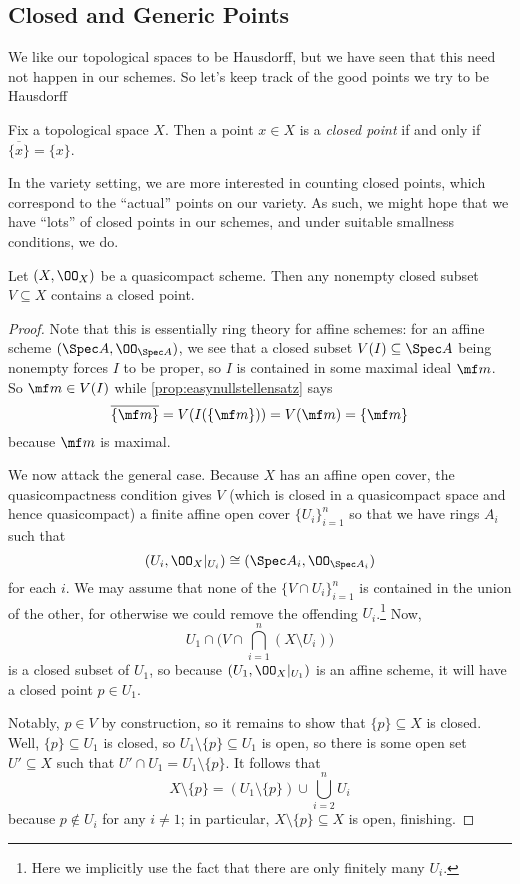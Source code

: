 \documentclass[../notes.tex]{subfiles}
\begin{document}
\subsection{Closed and Generic Points}
We like our topological spaces to be Hausdorff, but we have seen that this need not happen in our schemes. So let's keep track of the good points we try to be Hausdorff
\begin{definition}
	Fix a topological space $X$. Then a point $x\in X$ is a \textit{closed point} if and only if $\overline{\{x\}}=\{x\}$.
\end{definition}
In the variety setting, we are more interested in counting closed points, which correspond to the ``actual'' points on our variety. As such, we might hope that we have ``lots'' of closed points in our schemes, and under suitable smallness conditions, we do.
\begin{lemma}
	Let $(X,\OO_X)$ be a quasicompact scheme. Then any nonempty closed subset $V\subseteq X$ contains a closed point.
\end{lemma}
\begin{proof}
	Note that this is essentially ring theory for affine schemes: for an affine scheme $(\Spec A,\OO_{\Spec A})$, we see that a closed subset $V(I)\subseteq\Spec A$ being nonempty forces $I$ to be proper, so $I$ is contained in some maximal ideal $\mf m$. So $\mf m\in V(I)$ while \autoref{prop:easynullstellensatz} says
	\[\overline{\{\mf m\}}=V(I(\{\mf m\}))=V(\mf m)=\{\mf m\}\]
	because $\mf m$ is maximal.

	We now attack the general case. Because $X$ has an affine open cover, the quasicompactness condition gives $V$ (which is closed in a quasicompact space and hence quasicompact) a finite affine open cover $\{U_i\}_{i=1}^n$ so that we have rings $A_i$ such that
	\[(U_i,\OO_X|_{U_i})\cong(\Spec A_i,\OO_{\Spec A_i})\]
	for each $i$. We may assume that none of the $\{V\cap U_i\}_{i=1}^n$ is contained in the union of the other, for otherwise we could remove the offending $U_i$.\footnote{Here we implicitly use the fact that there are only finitely many $U_i$.} Now,
	\[U_1\cap\Bigg(V\cap\bigcap_{i=1}^n(X\setminus U_i)\Bigg)\]
	is a closed subset of $U_1$, so because $(U_1,\OO_X|_{U_1})$ is an affine scheme, it will have a closed point $p\in U_1$.

	Notably, $p\in V$ by construction, so it remains to show that $\{p\}\subseteq X$ is closed. Well, $\{p\}\subseteq U_1$ is closed, so $U_1\setminus\{p\}\subseteq U_1$ is open, so there is some open set $U'\subseteq X$ such that $U'\cap U_1=U_1\setminus\{p\}$. It follows that
	\[X\setminus\{p\}=(U_1\setminus\{p\})\cup\bigcup_{i=2}^nU_i\]
	because $p\notin U_i$ for any $i\ne1$; in particular, $X\setminus\{p\}\subseteq X$ is open, finishing.
\end{proof}
\end{document}

